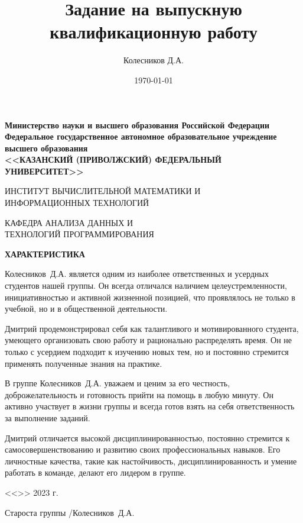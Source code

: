 \documentclass[a4paper,article]{article}
\author{Колесников Д.А.}
\title{Задание на выпускную квалификационную работу}
\date{\today}
\begin{document}
\begin{sloppypar}
    \begin{center}
        \textbf{Министерство науки и высшего образования Российской Федерации \\
        Федеральное государственное автономное образовательное учреждение \\
        высшего образования\\
        <<КАЗАНСКИЙ (ПРИВОЛЖСКИЙ) ФЕДЕРАЛЬНЫЙ УНИВЕРСИТЕТ>>} \\
    \end{center}
    
    \begin{center}
        ИНСТИТУТ ВЫЧИСЛИТЕЛЬНОЙ МАТЕМАТИКИ И \\
        ИНФОРМАЦИОННЫХ ТЕХНОЛОГИЙ
    \end{center}
    
    \begin{center}
        КАФЕДРА АНАЛИЗА ДАННЫХ И \\
        ТЕХНОЛОГИЙ ПРОГРАММИРОВАНИЯ
    \end{center}

    \begin{center}
        \textbf{ХАРАКТЕРИСТИКА} \\
    \end{center}

    Колесников~Д.А. является одним из наиболее ответственных и усердных студентов нашей группы. Он всегда отличался наличием целеустремленности, инициативностью и активной жизненной позицией, что проявлялось не только в учебной, но и в общественной деятельности.
    
    Дмитрий продемонстрировал себя как талантливого и мотивированного студента, умеющего организовать свою работу и рационально распределять время. Он не только с усердием подходит к изучению новых тем, но и постоянно стремится применять полученные знания на практике.
    
    В группе Колесников~Д.А. уважаем и ценим за его честность, доброжелательность и готовность прийти на помощь в любую минуту. Он активно участвует в жизни группы и всегда готов взять на себя ответственность за выполнение заданий.
    
    Дмитрий отличается высокой дисциплинированностью, постоянно стремится к самосовершенствованию и развитию своих профессиональных навыков. Его личностные качества, такие как настойчивость, дисциплинированность и умение работать в команде, делают его лидером в группе.
    
    \vfill
    
    \noindent
    <<\underline{\hspace{1cm}}>>\underline{\hspace{3cm}} 2023 г. \newline

    \hfill Староста группы \underline{\hspace{3cm}}/Колесников~Д.А.
\end{sloppypar}
\end{document}
